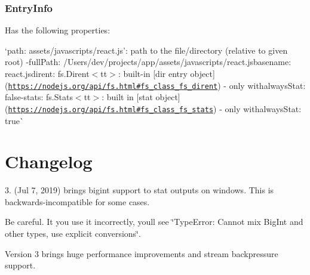 \subsubsection*{{\ttfamily Entry\+Info}}

Has the following properties\+:


\begin{DoxyItemize}
\item `path\+: \textquotesingle{}assets/javascripts/react.\+js'{\ttfamily \+: path to the file/directory (relative to given root) -\/}full\+Path\+: \textquotesingle{}/\+Users/dev/projects/app/assets/javascripts/react.jsbasename\+: \textquotesingle{}react.\+jsdirent\+: fs.\+Dirent$<$tt$>$\+: built-\/in \mbox{[}dir entry object\mbox{]}(\href{https://nodejs.org/api/fs.html#fs_class_fs_dirent}{\tt https\+://nodejs.\+org/api/fs.\+html\#fs\+\_\+class\+\_\+fs\+\_\+dirent}) -\/ only withalways\+Stat\+: false{\ttfamily  -\/}stats\+: fs.\+Stats$<$tt$>$\+: built in \mbox{[}stat object\mbox{]}(\href{https://nodejs.org/api/fs.html#fs_class_fs_stats}{\tt https\+://nodejs.\+org/api/fs.\+html\#fs\+\_\+class\+\_\+fs\+\_\+stats}) -\/ only withalways\+Stat\+: true\`{}
\end{DoxyItemize}

\section*{Changelog}

3. (Jul 7, 2019) brings {\ttfamily bigint} support to {\ttfamily stat} outputs on windows. This is backwards-\/incompatible for some cases.

Be careful. It you use it incorrectly, you\textquotesingle{}ll see \char`\"{}\+Type\+Error\+: Cannot mix Big\+Int and other types, use explicit conversions\char`\"{}.

Version 3 brings huge performance improvements and stream backpressure support.


